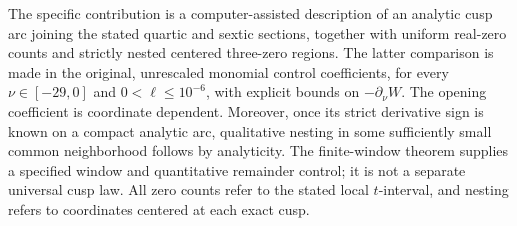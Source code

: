 The specific contribution is a computer-assisted description of an
analytic cusp arc joining the stated quartic and sextic sections,
together with uniform real-zero counts and strictly nested centered
three-zero regions. The latter comparison is made in the original,
unrescaled monomial control coefficients, for every
\(\nu\in[-29,0]\) and \(0<\ell\le10^{-6}\), with explicit bounds on
\(-\partial_\nu W\).
The opening coefficient is coordinate dependent. Moreover, once its
strict derivative sign is known on a compact analytic arc, qualitative
nesting in some sufficiently small common neighborhood follows by
analyticity. The finite-window theorem supplies a specified window
and quantitative remainder control; it is not a separate universal
cusp law. All zero counts refer to the stated local \(t\)-interval,
and nesting refers to coordinates centered at each exact cusp.

